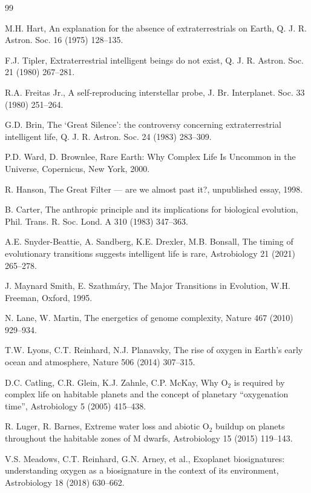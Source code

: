 \documentclass[preprint,12pt]{elsarticle}
\theoremstyle{definition}
\begin{document}
\begin{thebibliography}{99}

 M.H. Hart, An explanation for the absence of extraterrestrials on Earth, Q. J. R. Astron. Soc. 16 (1975) 128--135.

 F.J. Tipler, Extraterrestrial intelligent beings do not exist, Q. J. R. Astron. Soc. 21 (1980) 267--281.

 R.A. Freitas Jr., A self-reproducing interstellar probe, J. Br. Interplanet. Soc. 33 (1980) 251--264.

 G.D. Brin, The `Great Silence': the controversy concerning extraterrestrial intelligent life, Q. J. R. Astron. Soc. 24 (1983) 283--309.

 P.D. Ward, D. Brownlee, Rare Earth: Why Complex Life Is Uncommon in the Universe, Copernicus, New York, 2000.

 R. Hanson, The Great Filter --- are we almost past it?, unpublished essay, 1998.

 B. Carter, The anthropic principle and its implications for biological evolution, Phil. Trans. R. Soc. Lond. A 310 (1983) 347--363.

 A.E. Snyder-Beattie, A. Sandberg, K.E. Drexler, M.B. Bonsall, The timing of evolutionary transitions suggests intelligent life is rare, Astrobiology 21 (2021) 265--278.

 J. Maynard Smith, E. Szathm\'ary, The Major Transitions in Evolution, W.H. Freeman, Oxford, 1995.

 N. Lane, W. Martin, The energetics of genome complexity, Nature 467 (2010) 929--934.

 T.W. Lyons, C.T. Reinhard, N.J. Planavsky, The rise of oxygen in Earth's early ocean and atmosphere, Nature 506 (2014) 307--315.

 D.C. Catling, C.R. Glein, K.J. Zahnle, C.P. McKay, Why O$_2$ is required by complex life on habitable planets and the concept of planetary ``oxygenation time'', Astrobiology 5 (2005) 415--438.

 R. Luger, R. Barnes, Extreme water loss and abiotic O$_2$ buildup on planets throughout the habitable zones of M dwarfs, Astrobiology 15 (2015) 119--143.

 V.S. Meadows, C.T. Reinhard, G.N. Arney, et al., Exoplanet biosignatures: understanding oxygen as a biosignature in the context of its environment, Astrobiology 18 (2018) 630--662.


\end{thebibliography}
\end{document}
